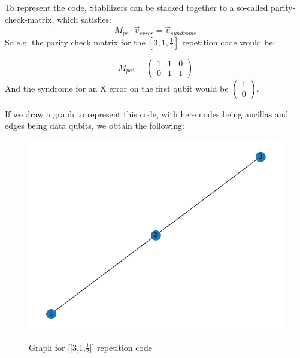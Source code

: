 To represent the code, Stabilizers can be stacked together to
a so-called parity-check-matrix, which satisfies:
\begin{equation}
	M_{pc}\cdot \vec{v}_{error} = \vec{v}_{syndrome}
\end{equation}
So e.g. the parity check matrix for the $[3,1,\frac{1}{2}]$
repetition code would be:

\begin{equation}
	M_{pc3} = \left( 
	\begin{array}{ccc}
		1 & 1 & 0 \\
		0 & 1 & 1
	\end{array}
	\right)
\end{equation}
And the syndrome for an X error on the first qubit would be
$\left(\begin{array}{c}1\\0\end{array}\right)$.

If we draw a graph to represent this code, with here nodes being ancillas
and edges being data qubits, we obtain the following:

\begin{figure}[h!]
	\begin{center}
	\captionsetup{justification=centering,margin=2cm}
	\includegraphics[scale=0.4]{./img/figures/rep_3_graph.png}\\
	\caption{Graph for [[3,1,$\frac{1}{2}$]] repetition code}
        
	\label{fig: rep_graph}
	\end{center}
\end{figure}
